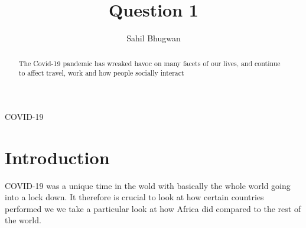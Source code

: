 \documentclass[12pt,preprint, authoryear]{elsarticle}
\numberwithin{equation}{section}
\numberwithin{figure}{section}
\numberwithin{table}{section}
\begin{document}
\begin{frontmatter}  %

\title{Question 1}





\author[Add1]{Sahil Bhugwan}
\ead{}





\address[Add1]{Github-\url{https://github.com/SBhugwan}}


\begin{abstract}
\small{
The Covid-19 pandemic has wreaked havoc on many facets of our lives, and
continue to affect travel, work and how people socially interact
}
\end{abstract}

\vspace{1cm}


\begin{keyword}
\footnotesize{
COVID-19 \\
\vspace{0.3cm}
}
\end{keyword}



\vspace{0.5cm}

\end{frontmatter}



\pagestyle{fancy}
\chead{}
\rhead{}
\lfoot{}
\lhead{}
\cfoot{}


\headsep 35pt %




\hypertarget{introduction}{%
\section{\texorpdfstring{Introduction
\label{Introduction}}{Introduction }}\label{introduction}}

COVID-19 was a unique time in the wold with basically the whole world
going into a lock down. It therefore is crucial to look at how certain
countries performed we we take a particular look at how Africa did
compared to the rest of the world.
\end{document}
